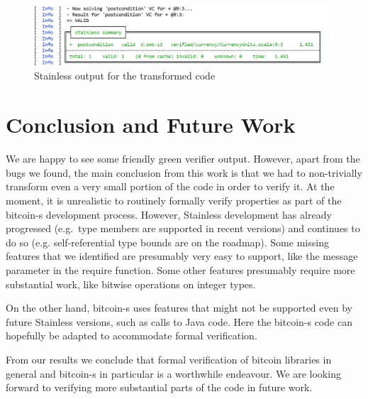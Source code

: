 \documentclass[hyphens, a4paper,USenglish,cleveref, autoref, thm-restate]{oasics-v2019}
\begin{document}
\begin{figure}
	\centering
		\includegraphics[width=\textwidth]{result_output}
	\caption{Stainless output for the transformed code}
  \label{fig:result}
\end{figure}


\section{Conclusion and Future Work}

We are happy to see some friendly green verifier output. However,
apart from the bugs we found, the main conclusion from this work is
that we had to non-trivially transform even a very small portion of
the code in order to verify it. At the moment, it is unrealistic to
routinely formally verify properties as part of the bitcoin-s
development process. However, Stainless development has already
progressed (e.g.\ type members are supported in recent versions) and
continues to do so (e.g. self-referential type bounds are on the
roadmap). Some missing features that we identified are presumably very
easy to support, like the message parameter in the require
function. Some other features presumably require more substantial
work, like bitwise operations on integer types.

On the other hand, bitcoin-s uses features that might not be supported
even by future Stainless versions, such as calls to Java code. Here
the bitcoin-s code can hopefully be adapted to accommodate formal
verification.

From our results we conclude that formal verification of bitcoin
libraries in general and bitcoin-s in particular is a worthwhile
endeavour. We are looking forward to verifying more substantial parts
of the code in future work.

\appendix


\end{document}
